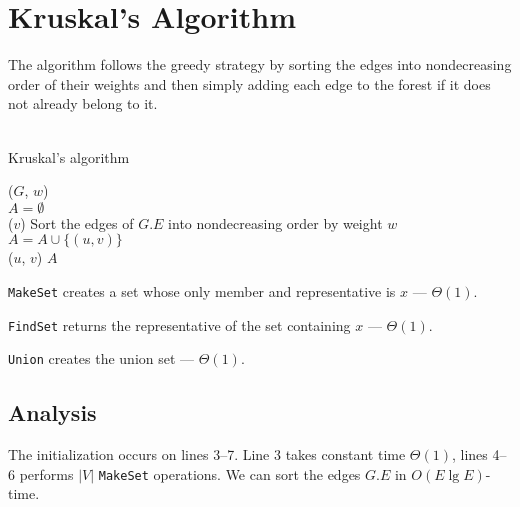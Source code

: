 \newpage
\section{Kruskal's Algorithm}
The algorithm follows the greedy strategy by sorting the edges into
nondecreasing order of their weights and then simply adding each edge to
the forest if it does not already belong to it.
\\\\
\begin{algorithm}[H]
	\caption{Kruskal's algorithm}
	\label{alg:kruskal-mst}
	
	
	
	
	\BlankLine
	\KruskalMST($G$, $w$) \\
	\Begin
	{
		$A = \emptyset$ \\
		{
			\MakeSet($v$)
		}
		Sort the edges of $G.E$ into nondecreasing order by weight $w$ \\
		
		{
			{
				$A = A \cup \{(u, v)\}$ \\
				\Union($u$, $v$)
			}
		}
		\Return $A$
	}
\end{algorithm}
\begin{description}
	\item \texttt{MakeSet} creates a set whose only member and representative is $x$ --- $\Theta(1)$.
	\item \texttt{FindSet} returns the representative of the set containing $x$ --- $\Theta(1)$.
	\item \texttt{Union} creates the union set --- $\Theta(1)$.
\end{description}

\subsection{Analysis}
%
The initialization occurs on lines 3--7. Line 3 takes constant time
$\Theta(1)$, lines 4--6 performs $|V|$ \texttt{MakeSet} operations. We can
sort the edges $G.E$ in $O(E \lg E)$-time.

